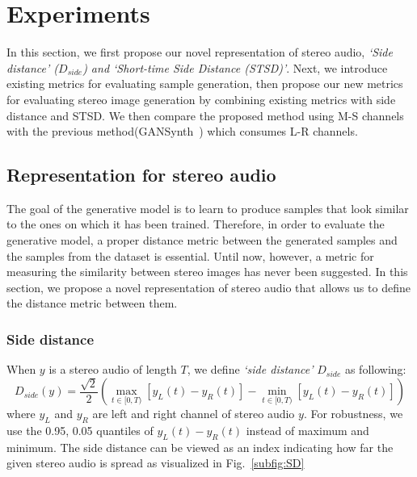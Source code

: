 \section{Experiments}
\label{sec:experiment}

In this section, we first propose our novel representation of stereo audio, \textit{`Side distance' ($D_{side}$) and `Short-time Side Distance (STSD)'}. Next, we introduce existing metrics for evaluating sample generation, then propose our new metrics for evaluating stereo image generation by combining existing metrics with side distance and STSD. We then compare the proposed method using M-S channels with the previous method(GANSynth~\cite{gansynth}) which consumes L-R channels.

\subsection{Representation for stereo audio}
\label{subsec:representation}
The goal of the generative model is to learn to produce samples that look similar to the ones on which it has been trained. Therefore, in order to evaluate the generative model, a proper distance metric between the generated samples and the samples from the dataset is essential. Until now, however, a metric for measuring the similarity between stereo images has never been suggested. In this section, we propose a novel representation of stereo audio that allows us to define the distance metric between them.

\subsubsection{Side distance}
\label{subsubsec:side_distance}

When $y$ is a stereo audio of length $T$, we define \textit{`side distance'} $D_{side}$ as following:
\begin{equation}
    D_{side}(y) = {\frac{\sqrt{2}}{2}}(\max_{t \in [0, T)} [y_L(t) - y_R(t)] - \min_{t \in [0, T)} [y_L(t) - y_R(t)])
\end{equation}
where $y_L$ and $y_R$ are left and right channel of stereo audio $y$. For robustness, we use the 0.95, 0.05 quantiles of $y_L(t) - y_R(t)$ instead of maximum and minimum. The side distance can be viewed as an index indicating how far the given stereo audio is spread as visualized in Fig.~\ref{subfig:SD}


